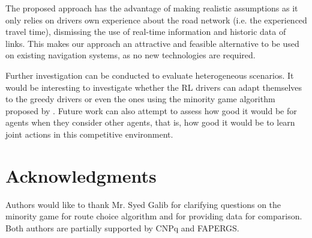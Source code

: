 \documentclass{RITA}
\begin{document}
The proposed approach has the advantage of making realistic assumptions as it only relies on drivers own experience about the road network (i.e. the experienced travel time), dismissing the use of real-time information and historic data of links. This makes our approach an attractive and feasible alternative to be used on existing navigation systems, as no new technologies are required.

Further investigation can be conducted to evaluate heterogeneous scenarios. It would be interesting to investigate whether the RL drivers can adapt themselves to the greedy drivers or even the ones using the minority game algorithm proposed by \cite{Galib&Moser2011}. Future work can also attempt to assess how good it would be for agents when they consider other agents, that is, how good it would be to learn joint actions in this competitive environment.

\section{Acknowledgments}

Authors would like to thank Mr. Syed Galib for clarifying questions on the minority game for route choice algorithm \cite{Galib&Moser2011} and for providing data for comparison. Both authors are partially supported by CNPq and FAPERGS. %


 
\end{document}
